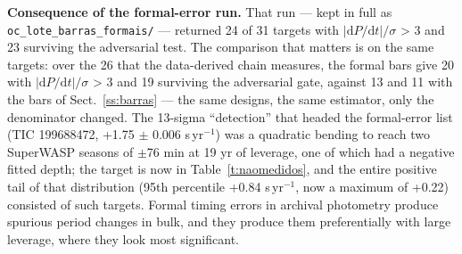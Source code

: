 \documentclass{aa}
\begin{document}
\textbf{Consequence of the formal-error run.} That run --- kept in full as \texttt{oc\_\allowbreak lote\_\allowbreak barras\_\allowbreak formais/} --- returned 24 of 31 targets with $|\mathrm{d}P/\mathrm{d}t|/\sigma$ > 3 and 23 surviving the adversarial test. The comparison that matters is on the same targets: over the 26 that the data-derived chain measures, the formal bars give 20 with $|\mathrm{d}P/\mathrm{d}t|/\sigma$ > 3 and 19 surviving the adversarial gate, against 13 and 11 with the bars of Sect.~\ref{ss:barras} --- the same designs, the same estimator, only the denominator changed. The 13-sigma ``detection'' that headed the formal-error list (TIC 199688472, +1.75 $\pm$ 0.006 s\,yr$^{-1}$) was a quadratic bending to reach two SuperWASP seasons of $\pm$76 min at 19 yr of leverage, one of which had a negative fitted depth; the target is now in Table~\ref{t:naomedidos}, and the entire positive tail of that distribution (95th percentile +0.84 s\,yr$^{-1}$, now a maximum of +0.22) consisted of such targets. Formal timing errors in archival photometry produce spurious period changes in bulk, and they produce them preferentially with large leverage, where they look most significant.
\end{document}
